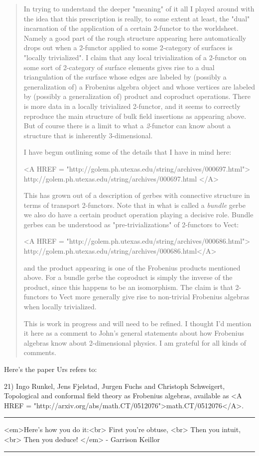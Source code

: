 \begin{quote}
In trying to understand the deeper "meaning" of it all
I played around with the idea that this prescription
is really, to some extent at least, the "dual"
incarnation of the application of a certain 2-functor
to the worldsheet. Namely a good part of the rough
structure appearing here automatically drops out
when a 2-functor applied to some 2-category of
surfaces is "locally trivialized". I claim that
any local trivialization of a 2-functor on
some sort of 2-category of surface elements gives
rise to a dual triangulation of the surface whose
edges are labeled by (possibly a generalization of)
a Frobenius algebra object and whose vertices are
labeled by (possibly a generalization of) product
and coproduct operations. There is more data
in a locally trivialized 2-functor, and it seems to
correctly reproduce the main structure of bulk field
insertions as appearing above. But of course there
is a limit to what a \emph{2}-functor can know about a
structure that is inherently 3-dimensional.

I have begun outlining some of the details that I
have in mind here:

<A HREF = "http://golem.ph.utexas.edu/string/archives/000697.html"> 
http://golem.ph.utexas.edu/string/archives/000697.html </A>

This has grown out of a description of gerbes with
connective structure in terms of transport 2-functors.
Note that in what is called a \emph{bundle} gerbe we also
do have a certain product operation playing a
decisive role. Bundle gerbes can be understood as
"pre-trivializations" of 2-functors to Vect:

<A HREF = "http://golem.ph.utexas.edu/string/archives/000686.html">
http://golem.ph.utexas.edu/string/archives/000686.html</A>

and the product appearing is one of the Frobenius
products mentioned above. For a bundle gerbe the
coproduct is simply the inverse of the product,
since this happens to be an isomorphism. The claim
is that 2-functors to Vect more generally give rise
to non-trivial Frobenius algebras when locally
trivialized.

This is work in progress and will need to be refined.
I thought I'd mention it here as a comment to John's
general statements about how Frobenius algebras know
about 2-dimensional physics. I am grateful for all
kinds of comments.
\end{quote}

Here's the paper Urs refers to: 

21) Ingo Runkel, Jens Fjelstad, Jurgen Fuchs and Christoph Schweigert,
Topological and conformal field theory as Frobenius algebras, available
as <A HREF = "http://arxiv.org/abs/math.CT/0512076">math.CT/0512076</A>.

\par\noindent\rule{\textwidth}{0.4pt}
<em>Here's how you do it:<br>
First you're obtuse, <br>
Then you intuit, <br>
Then you deduce! </em> - Garrison Keillor

\par\noindent\rule{\textwidth}{0.4pt}

